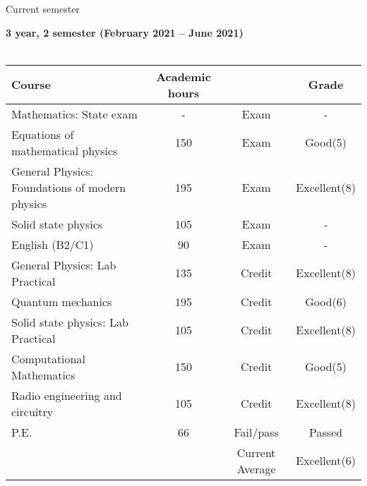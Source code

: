 \documentclass[a4paper]{article}
\begin{document}
\newpage
{\Large{Current semester}} \par 
\textbf{3 year, 2 semester (February 2021 -- June 2021)}\\ \\
\begin{tabular}{|p{6cm}|c|c|c|}
\hline
\textbf{Course}&\textbf{Academic hours}& &\textbf{Grade}\\
\hline
Mathematics: State exam & - & Exam & -\\

Equations of mathematical physics & 150 & Exam & Good(5) \\

General Physics: Foundations of modern physics & 195 & Exam & Excellent(8)\\

Solid state physics & 105 & Exam & -\\

English (B2/C1) & 90 & Exam & -\\

General Physics: Lab Practical & 135 & Credit & Excellent(8)\\

Quantum mechanics & 195 & Credit & Good(6)\\

Solid state physics: Lab Practical & 105 & Credit & Excellent(8)\\

Computational Mathematics & 150 & Credit & Good(5) \\

Radio engineering and circuitry & 105 & Credit & Excellent(8)\\

P.E.& 66 & Fail/pass & Passed \\
\hline
&& Current Average & Excellent(6)\\
\hline
\end{tabular}\\ 
\end{document}
